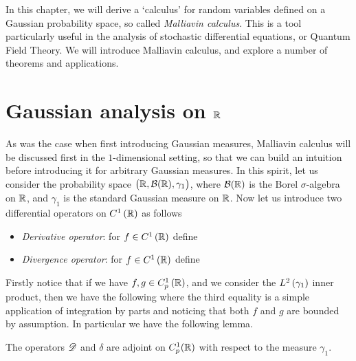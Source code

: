 \documentclass[../main.tex]{subfiles}
\begin{document}
In this chapter, we will derive a `calculus' for random variables defined on a Gaussian probability space, so called \emph{Malliavin calculus}. This is a tool particularly useful in the analysis of stochastic differential equations, or Quantum Field Theory. We will introduce Malliavin calculus, and explore a number of theorems and applications.

\section{Gaussian analysis on \texorpdfstring{$\operatorname{\mathbb{R}}$}{R}}
As was the case when first introducing Gaussian measures, Malliavin calculus will be discussed first in the $1$-dimensional setting, so that we can build an intuition before introducing it for arbitrary Gaussian measures. In this spirit, let us consider the probability space $\del{\R,\Bor(\R),\gamma_1}$, where $\mathcal{B}(\operatorname{\mathbb{R}})$ is the Borel $\sigma$-algebra on $\operatorname{\mathbb{R}}$, and $\gamma_1$ is the standard Gaussian measure on $\operatorname{\mathbb{R}}$. Now let us introduce two differential operators on $C^1\del{\R}$ as follows \begin{itemize}
    \item \emph{Derivative operator}: for $f\in C^1\del{\R}$ define 
    \item \emph{Divergence operator}: for $f\in C^1\del{\R}$ define 
\end{itemize}
Firstly notice that if we have $f,g\in C^1_p\del{\R}$, and we consider the $L^2\del{\gamma_1}$ inner product, then we have the following  where the third equality is a simple application of integration by parts and noticing that both $f$ and $g$ are bounded by assumption. In particular we have the following lemma.
\begin{lemma}
\label{lem:1d_operator_adjoint}
The operators $\mathscr{D}$ and $\delta$ are adjoint on $C^1_p(\operatorname{\mathbb{R}})$ with respect to the measure $\gamma_1$.
\end{lemma}
\end{document}
